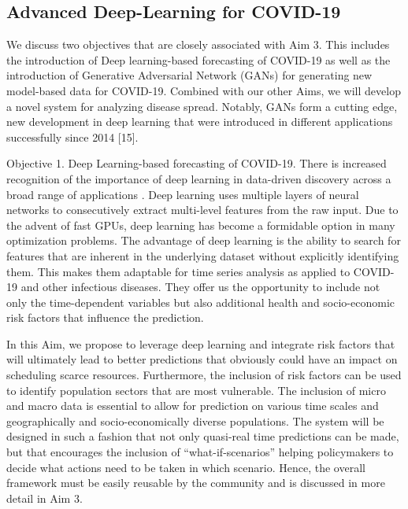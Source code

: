 \subsection{Advanced Deep-Learning for COVID-19}

We discuss two objectives that are closely associated with Aim 3. This includes the introduction of Deep learning-based forecasting of COVID-19 as well as the introduction of Generative Adversarial Network (GANs) for generating new model-based data for COVID-19. Combined with our other Aims, we will develop a novel system for analyzing disease spread. Notably, GANs form a cutting edge, new development in deep learning that were introduced in different applications successfully since 2014 [15].

Objective 1. Deep Learning-based forecasting of COVID-19. There is increased recognition of the importance of deep learning in data-driven discovery across a broad range of applications . Deep learning uses multiple layers of neural networks to consecutively extract multi-level features from the raw input. Due to the advent of fast GPUs, deep learning has become a formidable option in many optimization problems. The advantage of deep learning is the ability to search for features that are inherent in the underlying dataset without explicitly identifying them. This makes them adaptable for time series analysis as applied to COVID-19 and other infectious diseases. They offer us the opportunity to include not only the time-dependent variables but also additional health and socio-economic risk factors that influence the prediction. 

In this Aim, we propose to leverage deep learning and integrate risk factors that will ultimately lead to better predictions that obviously could have an impact on scheduling scarce resources. Furthermore, the inclusion of risk factors can be used to identify population sectors that are most vulnerable. The inclusion of micro and macro data is essential to allow for prediction on various time scales and geographically and socio-economically diverse populations. The system will be designed in such a fashion that not only quasi-real time predictions can be made, but that encourages the inclusion of “what-if-scenarios” helping policymakers to decide what actions need to be taken in which scenario. Hence, the overall framework must be easily reusable by the community and is discussed in more detail in Aim 3. 

